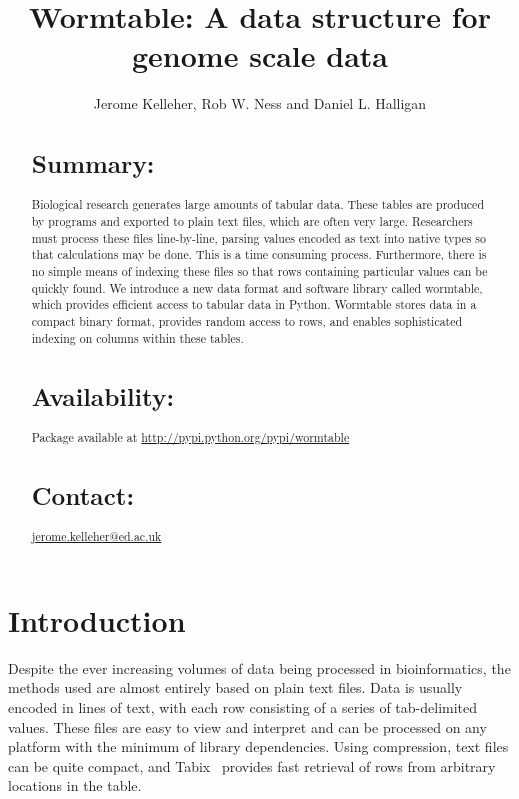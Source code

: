 \documentclass{bioinfo}
\begin{document}

\title[Wormtable]{Wormtable: A data structure for genome scale data}
\author[Kelleher \textit{et~al}]{Jerome Kelleher, Rob W. Ness 
and Daniel L. Halligan}
\address{
University of Edinburgh,
King's Buildings,
West Mains Road,
EH9 3JT,
UK
}



\maketitle

\begin{abstract}
\section{Summary:}
Biological research generates large amounts of tabular data.
These tables are produced by 
programs and exported to plain text files, which are often very large. 
Researchers must process these files 
line-by-line, parsing values encoded as text into native types so that 
calculations may be done. This is a time consuming process.
Furthermore, there is no simple means of indexing these files so that 
rows containing particular values can be quickly found. We introduce a new 
data format and software library called wormtable, which provides efficient 
access to tabular data in Python. Wormtable stores data in a compact
binary format, provides random access to rows, and enables sophisticated
indexing on columns within these tables. 
\section{Availability:}
Package available at 
\href{http://pypi.python.org/pypi/wormtable}{http://pypi.python.org/pypi/wormtable}

\section{Contact:} \href{jerome.kelleher@ed.ac.uk}{jerome.kelleher@ed.ac.uk}
\end{abstract}

\section{Introduction}
Despite the ever increasing volumes of data being processed in bioinformatics,
the methods used are almost entirely based on plain text files. Data is 
usually encoded in lines of text, with each row consisting of a series of tab-delimited 
values.
These files are easy to view and interpret and can be processed on 
any platform with the minimum of library dependencies. Using compression,
text files can be quite compact, and Tabix~\citep{li11} provides  
fast retrieval of rows from arbitrary locations in the table.
\end{document}
